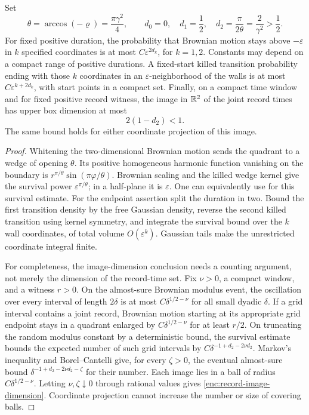 \begin{lemma}\label{enc:cone-estimates}
Set
\[
 \theta=\arccos(-\varrho)=\frac{\pi\gamma^2}{4},\qquad
 d_0=0,\quad d_1=\frac12,\quad d_2=\frac{\pi}{2\theta}
       =\frac2{\gamma^2}>\frac12.
\]
For fixed positive duration, the probability that Brownian motion stays
above $-\varepsilon$ in $k$ specified coordinates is at most
$C\varepsilon^{2d_k}$, for $k=1,2$.  Constants may depend on a compact
range of positive durations.  A fixed-start killed transition probability
ending with those $k$ coordinates in an $\varepsilon$-neighborhood of the
walls is at most $C\varepsilon^{k+2d_k}$, with start points in a compact
set.  Finally, on a compact time window and for fixed positive record
witness, the image in $\mathbb R^2$ of the joint record times has upper box
dimension at most
\begin{equation}\label{enc:record-image-dimension}
 2(1-d_2)<1.
\end{equation}
The same bound holds for either coordinate projection of this image.
\end{lemma}

\begin{proof}
Whitening the two-dimensional Brownian motion sends the quadrant to a
wedge of opening $\theta$.  Its positive homogeneous harmonic function
vanishing on the boundary is $r^{\pi/\theta}
\sin(\pi\varphi/\theta)$.  Brownian scaling and the killed wedge kernel
give the survival power $\varepsilon^{\pi/\theta}$; in a half-plane it
is $\varepsilon$.  One can equivalently use
\cite[Lemma 3.2]{GwynneMaoSunFKI} for this survival estimate.
For the endpoint assertion split the duration in two.  Bound the first
transition density by the free Gaussian density, reverse the second
killed transition using kernel symmetry, and integrate the survival
bound over the $k$ wall coordinates, of total volume $O(\varepsilon^k)$.
Gaussian tails make the unrestricted coordinate integral finite.

For completeness, the image-dimension conclusion needs a counting
argument, not merely the dimension of the record-time set.  Fix
$\nu>0$, a compact window, and a witness $r>0$.  On the almost-sure
Brownian modulus event, the oscillation over every interval of length
$2\delta$ is at most $C\delta^{1/2-\nu}$ for all small dyadic $\delta$.
If a grid interval contains a joint record, Brownian motion starting at
its appropriate grid endpoint stays in a quadrant enlarged by
$C\delta^{1/2-\nu}$ for at least $r/2$.  On truncating the random modulus
constant by a deterministic bound, the survival estimate bounds the
expected number of such grid intervals by
$C\delta^{-1+d_2-2\nu d_2}$.
Markov's inequality and Borel--Cantelli give, for every $\zeta>0$,
the eventual almost-sure bound
$\delta^{-1+d_2-2\nu d_2-\zeta}$ for their number.
Each image lies in a ball of radius
$C\delta^{1/2-\nu}$.  Letting $\nu,\zeta\downarrow0$ through rational values
gives \eqref{enc:record-image-dimension}.  Coordinate projection cannot
increase the number or size of covering balls.
\end{proof}


